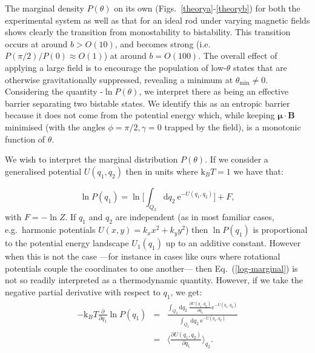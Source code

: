 \documentclass[aps,prl,twocolumn,superscriptaddress]{revtex4-1}
\newcommand{\vcrm}[1]{\mathbf{#1}}
\newcommand{\vc}[1]{\boldsymbol{#1}}
\newcommand{\dd}{\mathrm{d}}
\newcommand{\ee}{\mathrm{e}}
\newcommand{\kk}{\mathrm{k}_B}
\begin{document}
The marginal density $P(\theta)$ on its own (Figs.\ \ref{theorya}-\ref{theoryb}) for both the experimental system as well as that for an ideal rod under varying magnetic fields shows clearly the transition from monostability to bistability. This transition occurs at around $b > O(10)$, and becomes strong (i.e.\ $P(\pi/2)/P(0) \approx O(1)$) at around $b=O(100)$. The overall effect of applying a large field is to encourage the population of low-$\theta$ states that are otherwise gravitationally suppressed, revealing a minimum at $\theta_{\text{min}}\ne 0$. Considering the quantity -$\ln P(\theta)$, we interpret there as being an effective barrier separating two bistable states. We identify this as an entropic barrier because it does not come from the potential energy which, while keeping $\vc{\mu}\cdot\vcrm{B}$ minimised (with the angles $\phi=\pi/2,\gamma=0$ trapped by the field), is a monotonic function of $\theta$.







 
%
%
%
%
%
%
%
 We wish to interpret the marginal distribution $P(\theta)$. If we consider a generalised potential $U(q_1,q_2)$ then in units where $\kk T=1$ we have that:

\begin{equation}\label{log-marginal}
\ln{P(q_1)} = \ln\Big[ \int_{Q_2} \dd q_2\ \ee^{-U(q_1,q_2)} \Big] + F,
\end{equation}with $F=-\ln Z$. If $q_1$ and $q_2$ are independent (as in most familiar cases, e.g.\ harmonic potentials $U(x,y)= k_x x^2 + k_y y^2$) then $\ln P(q_1)$ is proportional to the potential energy landscape $U_1(q_1)$ up to an additive constant. However when this is not the case ---for instance in cases like ours where rotational potentials couple the coordinates to one another--- then Eq.\ (\ref{log-marginal}) is not so readily interpreted as a thermodynamic quantity. However, if we take the negative partial derivative with respect to $q_1$, we get:
\begin{eqnarray}
-\kk T\frac{\partial }{\partial q_1} \ln{P(q_1)} & = & \frac{\int_{Q_2} \dd q_2 \ \frac{\partial U(q_1,q_2)}{\partial q_1} \ee^{-U(q_1,q_2)} }{\int_{Q_2} \dd q_2 \  \ee^{-U(q_1,q_2)}}\nonumber \\ 
& = & \Big\langle \frac{\partial U(q_1,q_2)}{\partial q_1} \Big\rangle_{q_2}.
\end{eqnarray}
\end{document}

